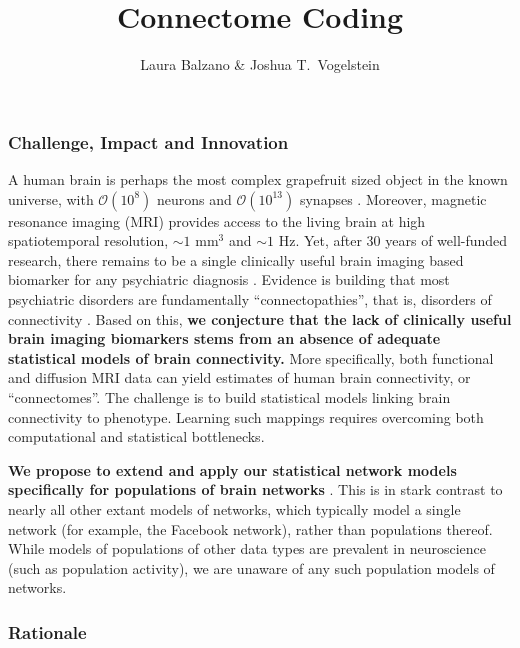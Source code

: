 \documentclass[times,11pt]{article} %
\title{\vspace{-50pt}Connectome Coding}
\author{Laura Balzano \& Joshua T.~Vogelstein}
\date{}
\begin{document}


\maketitle

\subsubsection*{Challenge, Impact and Innovation}


A human brain is perhaps the most complex grapefruit sized object in the known universe, with $\mathcal{O}(10^8)$ neurons and $\mathcal{O}(10^{13})$ synapses \cite{??}.   Moreover,  magnetic resonance imaging (MRI) provides access to the living brain at high spatiotemporal resolution, $\sim$$1$ mm$^3$ and $\sim$$1$ Hz.  Yet, after 30 years of well-funded research, there remains to be a single clinically useful brain imaging based biomarker for any psychiatric diagnosis \cite{APA}. 
% 
Evidence is building that most psychiatric disorders are fundamentally ``connectopathies'', that is, disorders of connectivity \cite{??}. Based on this, 
\textbf{we conjecture that the lack of clinically useful brain imaging biomarkers stems from an absence of adequate statistical models of brain connectivity.} More specifically, both functional and diffusion MRI data can yield estimates of human brain connectivity, or ``connectomes''.  The challenge is to build statistical models linking brain connectivity to phenotype.  Learning such mappings requires overcoming both computational and statistical bottlenecks.

% 
\textbf{We propose to extend and apply our statistical network models specifically for populations of brain networks} \cite{a bunch}.  This is in stark contrast to nearly all other extant models of networks, which typically model a single network (for example, the Facebook network), rather than populations thereof.  While models of populations of other data types are prevalent in neuroscience (such as population activity), we are unaware of any such population models of networks.



\subsubsection*{Rationale}
\end{document}
